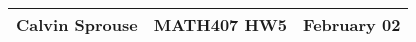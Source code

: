 \documentclass[a4paper, 12pt]{config/homework}
\begin{document}
\noindent
\begin{tabularx}{\textwidth}{>{\centering\arraybackslash}X>{\centering\arraybackslash}X>{\centering\arraybackslash}X}
Calvin Sprouse & MATH407 HW5 & 2024 February 02\\
\midrule
\end{tabularx}




\end{document}
